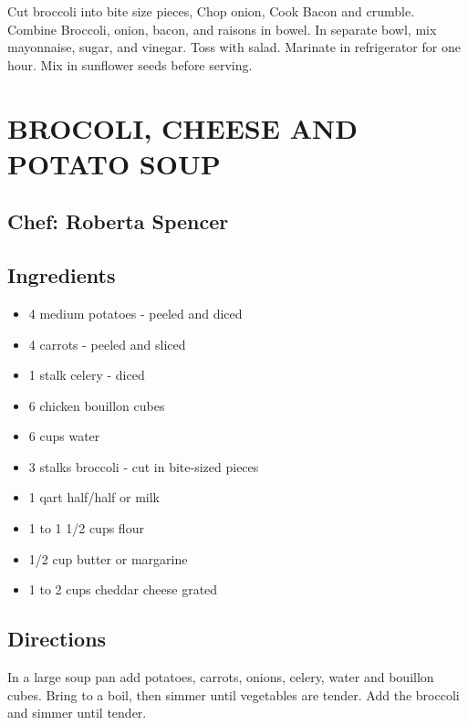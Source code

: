\documentclass[
]{book}
\providecommand{\tightlist}{%
  \setlength{\itemsep}{0pt}\setlength{\parskip}{0pt}}
\begin{document}
Cut broccoli into bite size pieces, Chop onion, Cook Bacon and crumble.
Combine Broccoli, onion, bacon, and raisons in bowel.
In separate bowl, mix mayonnaise, sugar, and vinegar. Toss with salad.
Marinate in refrigerator for one hour.
Mix in sunflower seeds before serving.

\hypertarget{brocoli-cheese-and-potato-soup}{%
\section*{BROCOLI, CHEESE AND POTATO SOUP}\label{brocoli-cheese-and-potato-soup}}


\hypertarget{chef-roberta-spencer-1}{%
\subsection*{Chef: Roberta Spencer}\label{chef-roberta-spencer-1}}


\hypertarget{ingredients-15}{%
\subsection*{Ingredients}\label{ingredients-15}}


\begin{itemize}
\tightlist
\item
  4 medium potatoes - peeled and diced
\item
  4 carrots - peeled and sliced
\item
  1 stalk celery - diced
\item
  6 chicken bouillon cubes
\item
  6 cups water
\item
  3 stalks broccoli - cut in bite-sized pieces
\item
  1 qart half/half or milk
\item
  1 to 1 1/2 cups flour
\item
  1/2 cup butter or margarine
\item
  1 to 2 cups cheddar cheese grated
\end{itemize}

\hypertarget{directions-15}{%
\subsection*{Directions}\label{directions-15}}


In a large soup pan add potatoes, carrots, onions, celery, water and bouillon cubes.
Bring to a boil, then simmer until vegetables are tender. Add the broccoli and simmer until tender.
\end{document}
